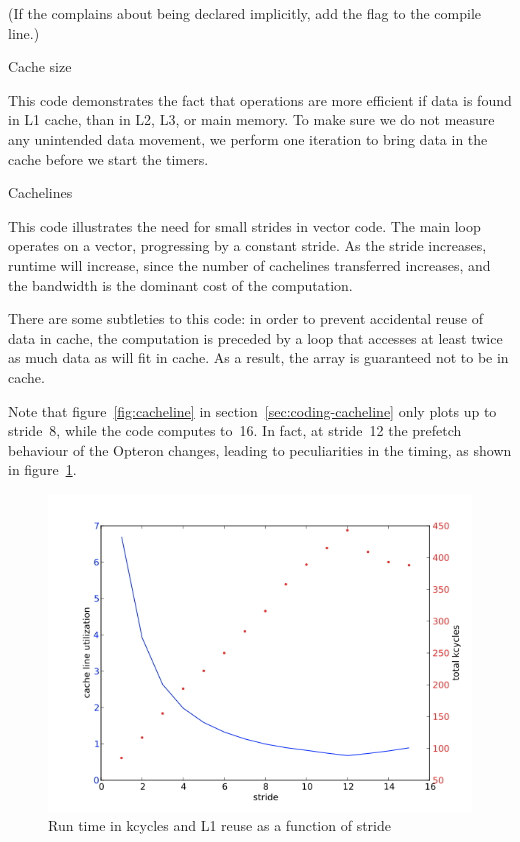(If the  complains about
 being declared implicitly, add the 
flag to the compile line.)

 {Cache size}
\label{sec:cachesize-code}

This code demonstrates the fact that operations are more efficient if
data is found in L1 cache, than in L2, L3, or main memory. To make
sure we do not measure any unintended data movement, we perform one
iteration to bring data in the cache before we start the timers.

\begingroup\small

\endgroup

 {Cachelines}
\label{sec:cacheline-code}

This code illustrates the need for small strides in vector code. The
main loop operates on a vector, progressing by a constant stride. As
the stride increases, runtime will increase, since the number of
cachelines transferred increases, and the bandwidth is the dominant
cost of the computation.

There are some subtleties to this code: in order to prevent accidental
reuse of data in cache, the computation is preceded by a loop that
accesses at least twice as much data as will fit in cache. As a
result, the array is guaranteed not to be in cache.

\begingroup\small

\endgroup

Note that figure~\ref{fig:cacheline} in
section~\ref{sec:coding-cacheline} only plots up to stride~8, while
the code computes to~16. In fact, at stride~12 the prefetch behaviour
of the Opteron changes, leading to peculiarities in the timing, as
shown in figure~\ref{fig:cacheline16}.
\begin{figure}[ht]
  \includegraphics[scale=.5]{graphics/cacheline16}
  \caption{Run time in kcycles and L1 reuse as a function of stride}
  \label{fig:cacheline16}
\end{figure}

